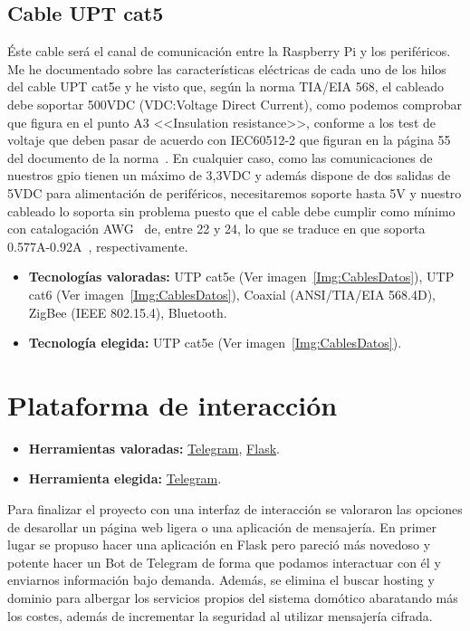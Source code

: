 \subsection{Cable UPT cat5}
Éste cable será el canal de comunicación entre la Raspberry Pi y los periféricos.
Me he documentado sobre las características eléctricas de cada uno de los hilos del cable UPT cat5e y he visto que, según la norma TIA/EIA 568, el cableado debe soportar 500VDC (VDC:Voltage Direct Current), como podemos comprobar que figura en el punto A3 <<Insulation resistance>>, conforme a los test de voltaje que deben pasar de acuerdo con IEC60512-2 que figuran en la página 55 del documento de la norma~\cite{manual:568.2}. En cualquier caso, como las comunicaciones de nuestros gpio tienen un máximo de 3,3VDC y además dispone de dos salidas de 5VDC para alimentación de periféricos, necesitaremos soporte hasta 5V y nuestro cableado lo soporta sin problema puesto que el cable debe cumplir como mínimo con catalogación AWG~\cite{wiki:DefAWG} de, entre 22 y 24, lo que se traduce en que soporta 0.577A-0.92A~\cite{wiki:TablaAWG}, respectivamente.

\begin{itemize}
    \item \textbf{Tecnologías valoradas:} UTP cat5e (Ver imagen~\ref{Img:CablesDatos}), UTP cat6 (Ver imagen~\ref{Img:CablesDatos}), Coaxial (ANSI/TIA/EIA 568.4D), ZigBee (IEEE 802.15.4), Bluetooth\cite{manual:IEEE802.11}. 
    \item \textbf{Tecnología elegida:} UTP cat5e (Ver imagen~\ref{Img:CablesDatos}).
\end{itemize}



\section{Plataforma de interacción}\label{4:telegram}
\begin{itemize}
    \item \textbf{Herramientas valoradas:} \href{https://telegram.org/}{Telegram}, \href{https://palletsprojects.com/p/flask/}{Flask}.
    \item \textbf{Herramienta elegida:} \href{https://telegram.org/}{Telegram}.
\end{itemize}
Para finalizar el proyecto con una interfaz de interacción se valoraron las opciones de desarollar un página web ligera o una aplicación de mensajería.
En primer lugar se propuso hacer una aplicación en Flask pero pareció más novedoso y potente hacer un Bot de Telegram de forma que podamos interactuar con él y enviarnos información bajo demanda. Además, se elimina el buscar hosting y dominio para albergar los servicios propios del sistema domótico abaratando más los costes, además de incrementar la seguridad al utilizar mensajería cifrada.

